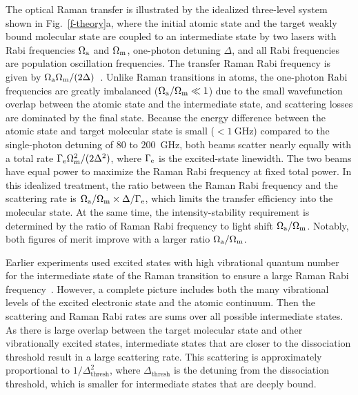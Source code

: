 \documentclass[aps,prx,twocolumn,10pt,superscriptaddress]{revtex4-2}
\begin{document}
The optical Raman transfer is illustrated
by the idealized three-level system shown in Fig.~\ref{f-theory}a,
where the initial atomic state and the target weakly bound molecular state are coupled to an intermediate state by two lasers with Rabi frequencies $\Omega_{\rm a}$ and $\Omega_{\rm m}$, one-photon detuning $ \Delta $, and all Rabi frequencies are population oscillation frequencies.
The transfer Raman Rabi frequency is given by $\Omega_{\rm a}\Omega_{\rm m} / (2\Delta)$~\cite{Wineland2003}.
Unlike Raman transitions in atoms, the one-photon Rabi frequencies are greatly imbalanced ($\Omega_{\rm a}/\Omega_{\rm m} \ll 1$)
due to the small wavefunction overlap between the atomic state and the intermediate state,
and scattering losses are dominated by the final state. Because the energy difference between the atomic state and target molecular state is small ($ < 1~\mathrm{GHz} $) compared to the single-photon detuning of $80$ to $200$~GHz, both beams scatter nearly equally with a total rate $ \Gamma_{\rm e} \Omega_{\rm m}^2 / (2\Delta^2)$, where $ \Gamma_{\rm e} $ is the excited-state linewidth.  The two beams have equal power to maximize the Raman Rabi frequency at fixed total power.
In this idealized treatment, the ratio between the Raman Rabi frequency and the scattering rate is $ \Omega_{\rm a}/\Omega_{\rm m} \times \Delta/\Gamma_{\rm e} $, which limits the transfer efficiency into the molecular state. At the same time, the intensity-stability requirement is determined by the ratio of Raman Rabi frequency to light shift $\Omega_{\rm a}/\Omega_{\rm m}$. Notably, both figures of merit improve with a larger ratio $\Omega_{\rm a}/\Omega_{\rm m}$.

Earlier experiments used excited states with high vibrational quantum number for the intermediate state
of the Raman transition to ensure a large Raman Rabi frequency~\cite{Wynar2000,Rom2004}.
However, a complete picture includes both the many vibrational levels
of the excited electronic state and the atomic continuum.
Then the scattering and Raman Rabi rates are sums over all possible intermediate states.
As there is large overlap between the target molecular state and other vibrationally excited states, intermediate states that are closer to the dissociation threshold result in a large scattering rate.
This scattering is approximately proportional to $1/\Delta_{\mathrm{thresh}}^2$,
where $\Delta_{\mathrm{thresh}}$ is the detuning from the dissociation threshold,
which is smaller for intermediate states that are deeply bound.
\end{document}
